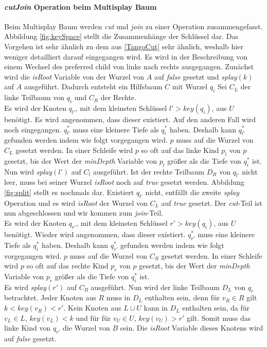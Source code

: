 \documentclass[a4paper,12pt]{article}
\begin{document}
\paragraph{\textit{cutJoin} Operation beim Multisplay Baum}
Beim Multisplay Baum werden \textit{cut} und \textit{join} zu einer Operation zusammengefasst. Abbildung \ref{fig:keySpace} stellt die Zusammenhänge der Schlüssel dar. Das Vorgehen ist sehr ähnlich zu dem aus \ref{TangoCut} sehr ähnlich, weshalb hier weniger detailliert darauf eingegangen wird. Es wird in der Beschreibung von einem Wechsel des preferred child von links nach rechts ausgegangen.
Zunächst wird die \textit{isRoot} Variable von der Wurzel von $A$ auf \textit{false} gesetzt und \textit{splay}$\left(k\right)$ auf $A$ ausgeführt. Dadurch entsteht ein Hilfsbaum $C$ mit Wurzel $q_i$ Sei $C_L$ der linke Teilbaum von $q_i$ und $C_R$ der Rechte.\\
 Es wird der Knoten $q_{l'}$, mit dem kleinsten Schlüssel $l' > \textit{key}\left(q_i\right)$, aus $U$ benötigt. Es wird angenommen, dass dieser existiert. Auf den anderen Fall wird noch eingegangen. $q_{l'}^*$ muss eine kleinere Tiefe als  $q_i^*$ haben. Deshalb kann $q_{l'}^*$ gefunden werden indem  wie folgt vorgegangen wird. $p$ muss auf die Wurzel von $C_L$ gesetzt werden. In einer Schleife wird $p$ so oft auf das linke Kind $p_l$ von $p$ gesetzt, bis der Wert der \textit{minDepth} Variable von $p_l$ größer als die Tiefe von $q_i^*$  ist.\\
 Nun wird \textit{splay}$\left(l'\right)$ auf $C_l$ ausgeführt. Ist der rechte Teilbaum $D_R$ von $q_{l'}$ nicht leer,  muss bei seiner Wurzel \textit{isRoot} noch auf \textit{true} gesetzt werden. Abbildung \ref{fig:split} stellt es nochmals dar. Existiert  $q_{l'}$ nicht, entfällt die zweite \textit{splay} Operation und es wird \textit{isRoot} der Wurzel von $C_L$ auf \textit{true} gesetzt. Der \textit{cut}-Teil ist nun abgeschlossen und wir kommen zum \textit{join}-Teil. \\
 Es wird der Knoten $q_{r'}$, mit dem kleinsten Schlüssel $r' > \textit{key}\left(q_i\right)$, aus $U$ benötigt. Wieder wird angenommen, dass dieser existiert.  $q_{r'}^*$ muss eine kleinere Tiefe als  $q_i^*$ haben. Deshalb kann $q_{r'}^*$ gefunden werden indem  wie folgt vorgegangen wird. $p$ muss auf die Wurzel von $C_R$ gesetzt werden. In einer Schleife wird $p$ so oft auf das rechte Kind $p_r$ von $p$ gesetzt, bis der Wert der \textit{minDepth} Variable von $p_r$ größer als die Tiefe von $q_i^*$  ist.\\
 Es wird \textit{splay}$\left(r'\right)$ auf $C_R$ ausgeführt. Nun wird der linke Teilbaum $D_L$ von $q_r$ betrachtet. Jeder Knoten aus $R$ muss in $D_L$ enthalten sein, denn für $v_R \in R$ gilt $k < \mathit{key}\left(v_R\right) < r'$. Kein Knoten aus $L \cup U$ kann in $D_L$ enthalten sein, da für $v_L \in  L$,  $ \mathit{key}\left(v_L\right) < k$ und für  für $v_U \in  U$,  $ \mathit{key}\left(v_U\right) > r'$ gilt. Somit muss das linke Kind von $q_{r'}$ die Wurzel von $B$ sein. Die \textit{isRoot} Variable dieses Knotens wird auf \textit{false} gesetzt.
\end{document}
